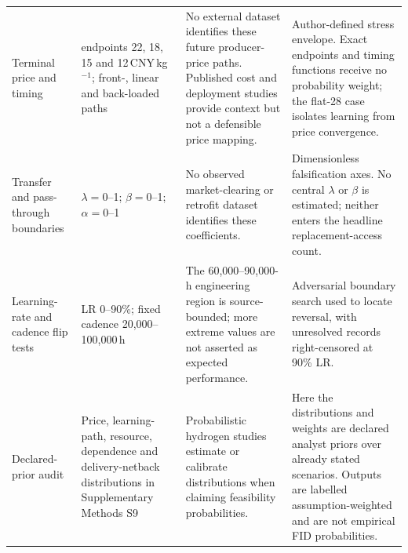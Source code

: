 \documentclass[11pt,a4paper]{article}
\begin{document}
\begin{longtable}{>{\raggedright\arraybackslash}p{}>{\raggedright\arraybackslash}p{}>{\raggedright\arraybackslash}p{}>{\raggedright\arraybackslash}p{}}
Terminal price and timing & 2060 endpoints 22, 18, 15 and 12\,CNY\,kg$^{-1}$; front-, linear and back-loaded paths & No external dataset identifies these future producer-price paths. Published cost and deployment studies provide context but not a defensible price mapping\cite{glenk2023,iea2025}. & Author-defined stress envelope. Exact endpoints and timing functions receive no probability weight; the flat-28 case isolates learning from price convergence. \\
Transfer and pass-through boundaries & $\lambda=0$--1; $\beta=0$--1; $\alpha=0$--1 & No observed market-clearing or retrofit dataset identifies these coefficients. & Dimensionless falsification axes. No central $\lambda$ or $\beta$ is estimated; neither enters the headline replacement-access count. \\
Learning-rate and cadence flip tests & LR 0--90\%; fixed cadence 20,000--100,000\,h & The 60,000--90,000-h engineering region is source-bounded\cite{doe2024,worldbank2026}; more extreme values are not asserted as expected performance. & Adversarial boundary search used to locate reversal, with unresolved records right-censored at 90\% LR. \\
Declared-prior audit & Price, learning-path, resource, dependence and delivery-netback distributions in Supplementary Methods S9 & Probabilistic hydrogen studies estimate or calibrate distributions when claiming feasibility probabilities\cite{odenweller2022}. & Here the distributions and weights are declared analyst priors over already stated scenarios. Outputs are labelled assumption-weighted and are not empirical FID probabilities. \\
\end{longtable}
\endgroup
\end{document}
